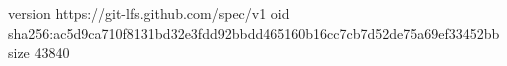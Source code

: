 version https://git-lfs.github.com/spec/v1
oid sha256:ac5d9ca710f8131bd32e3fdd92bbdd465160b16cc7cb7d52de75a69ef33452bb
size 43840

